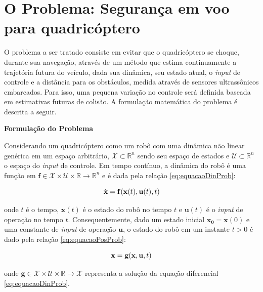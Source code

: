 \documentclass[a4paper, 12pt]{article}
\begin{document}
\newpage

\section{O Problema: Segurança em voo para quadricóptero}
\label{sec:prob}

O problema a ser tratado consiste em evitar que o quadricóptero se choque, durante sua navegação, através de um método que estima continuamente a trajetória futura do veículo, dada sua dinâmica, seu estado atual, o \textit{input} de controle e a distância para os obstáculos, medida através de sensores ultrassônicos embarcados. Para isso, uma pequena variação no controle será definida baseada em estimativas futuras de colisão. A formulação matemática do problema é descrita a seguir.



\noindent\textbf{Formulação do Problema}

Considerando um quadricóptero como um robô com uma dinâmica não linear genérica em um espaço arbitrário, $\mathcal{X} \subset \mathbb{R}^{n}$ sendo seu espaço de estados e $\mathcal{U} \subset \mathbb{R}^{n}$ o espaço do \textit{input} de controle. Em tempo contínuo, a dinâmica do robô é uma função em $\mathbf{f} \in \mathcal{X} \times \mathcal{U} \times \mathbb{R} \rightarrow \mathbb{R}^{n}$ e é dada pela relação \ref{eq:equacaoDinProb}:

\begin{equation}
\centering
\dot{\mathbf{x}} = \mathbf{f}(\mathbf{x}(t),\mathbf{u}(t),t)  
\label{eq:equacaoDinProb}
\end{equation}

\noindent onde $t$ é o tempo, $\mathbf{x}(t)$ é o estado do robô no tempo $t$ e $\mathbf{u}(t)$ é o \textit{input} de operação no tempo $t$. Consequentemente, dado um estado inicial $\mathbf{x_0} = \mathbf{x}(0)$ e uma constante de \textit{input} de operação $\mathbf{u}$, o estado do robô em um instante $t > 0$ é dado pela relação \ref{eq:equacaoPosProb}:
 

\begin{equation}
\centering
\mathbf{x} = \mathbf{g}(\mathbf{x},\mathbf{u},t)  
\label{eq:equacaoPosProb}
\end{equation}

\noindent onde $\mathbf{g} \in \mathcal{X} \times \mathcal{U} \times \mathbb{R} \rightarrow \mathcal{X}$ representa a solução da equação diferencial \ref{eq:equacaoDinProb}.
\end{document}
